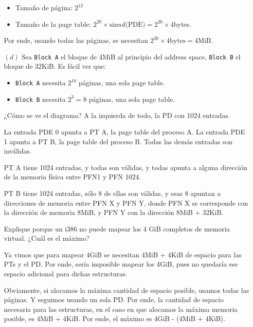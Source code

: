 \documentclass[12pt]{article}
\theoremstyle{definition}
\begin{document}
\begin{itemize}
    \item Tamaño de página: $2^{12}$
    \item Tamaño de la page table: $2^{20} \times \text{sizeof(PDE)} = 2^{20}
        \times 4$bytes.
\end{itemize}

Por ende, usando todas las páginas, se necesitan $2^{20} \times 4 \text{bytes} =
4\text{MiB}$.

$(d)$ Sea \texttt{Block A} el bloque de 4MiB al principio del address space,
\texttt{Block B} el bloque de 32KiB. Es fácil ver que: 

\begin{itemize}
    \item \texttt{Block A} necesita $2^{10}$ páginas, una sola page table. 

    \item \texttt{Block B} necesita $2^3 = 8$ páginas, una sola page table.
\end{itemize}

¿Cómo se ve el diagrama? A la izquierda de todo, la PD con 1024 entradas. 

La entrada PDE 0 apunta a PT A, la page table del proceso A. La entrada PDE 1
apunta a PT B, la page table del proceso B. Todas las demás entradas son
inválidas.

PT A tiene 1024 entradas, y todas son válidas, y todas apunta a alguna dirección
de la memoria física entre PFN1 y PFN 1024.

PT B tiene 1024 entradas, sólo 8 de ellas son válidas, y esas 8 apuntan a
direcciones de memoria entre PFN X y PFN Y, donde PFN X se corresponde con la
dirección de memoria 8MiB, y PFN Y con la dirección 8MiB + 32KiB.

\pagebreak 

\begin{shaded}
    Explique porque un i386 no puede mapear los 4 GiB completos de memoria virtual.
¿Cuál es el máximo?
\end{shaded}

Ya vimos que para mapear 4GiB se necesitan 4MiB + 4KiB de espacio para las PTs y
el PD. Por ende, sería imposible mapear los 4GiB, pues no quedaría ese espacio
adicional para dichas estructuras.

Obviamente, si alocamos la máxima cantidad de espacio posible, usamos todas las
páginas. Y seguimos usando un sola PD. Por ende, la cantidad de espacio
necesaria para las estructuras, en el caso en que alocamos la máxima memoria
posible, es 4MiB + 4KiB. Por ende, el máximo es 4GiB - (4MiB + 4KiB).
\end{document}

